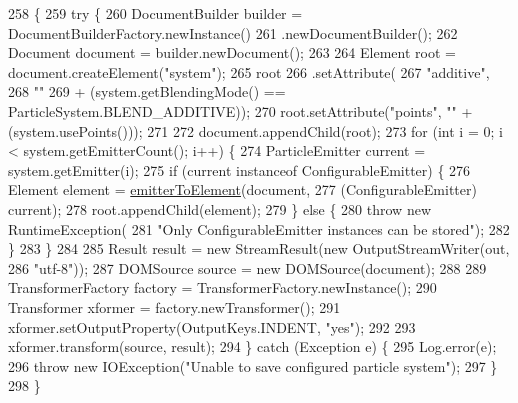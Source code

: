 \begin{DoxyCode}
258                                                       \{
259         \textcolor{keywordflow}{try} \{
260             DocumentBuilder builder = DocumentBuilderFactory.newInstance()
261                     .newDocumentBuilder();
262             Document document = builder.newDocument();
263 
264             Element root = document.createElement(\textcolor{stringliteral}{"system"});
265             root
266                     .setAttribute(
267                             \textcolor{stringliteral}{"additive"},
268                             \textcolor{stringliteral}{""}
269                                     + (system.getBlendingMode() == ParticleSystem.BLEND\_ADDITIVE));
270             root.setAttribute(\textcolor{stringliteral}{"points"}, \textcolor{stringliteral}{""} + (system.usePoints()));
271 
272             document.appendChild(root);
273             \textcolor{keywordflow}{for} (\textcolor{keywordtype}{int} i = 0; i < system.getEmitterCount(); i++) \{
274                 ParticleEmitter current = system.getEmitter(i);
275                 \textcolor{keywordflow}{if} (current instanceof ConfigurableEmitter) \{
276                     Element element = \mbox{\hyperlink{classorg_1_1newdawn_1_1slick_1_1particles_1_1_particle_i_o_af9519582cb522c103cc0a829fb3e8413}{emitterToElement}}(document,
277                             (ConfigurableEmitter) current);
278                     root.appendChild(element);
279                 \} \textcolor{keywordflow}{else} \{
280                     \textcolor{keywordflow}{throw} \textcolor{keyword}{new} RuntimeException(
281                             \textcolor{stringliteral}{"Only ConfigurableEmitter instances can be stored"});
282                 \}
283             \}
284 
285             Result result = \textcolor{keyword}{new} StreamResult(\textcolor{keyword}{new} OutputStreamWriter(out,
286                     \textcolor{stringliteral}{"utf-8"}));
287             DOMSource source = \textcolor{keyword}{new} DOMSource(document);
288 
289             TransformerFactory factory = TransformerFactory.newInstance();
290             Transformer xformer = factory.newTransformer();
291             xformer.setOutputProperty(OutputKeys.INDENT, \textcolor{stringliteral}{"yes"});
292 
293             xformer.transform(source, result);
294         \} \textcolor{keywordflow}{catch} (Exception e) \{
295             Log.error(e);
296             \textcolor{keywordflow}{throw} \textcolor{keyword}{new} IOException(\textcolor{stringliteral}{"Unable to save configured particle system"});
297         \}
298     \}
\end{DoxyCode}
\mbox{\label{classorg_1_1newdawn_1_1slick_1_1particles_1_1_particle_i_o_a38e0daafdd03fa48eb938576567fc4cc}} 
